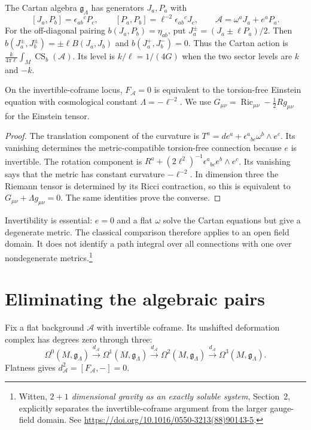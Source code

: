 The Cartan algebra $\mathfrak g_\Lambda$ has generators $J_a,P_a$ with
\[
 [J_a,P_b]=\epsilon_{ab}{}^cP_c,
 \qquad [P_a,P_b]=\ell^{-2}\epsilon_{ab}{}^cJ_c,
 \qquad \mathcal A=\omega^aJ_a+e^aP_a.
\]
For the off-diagonal pairing $b(J_a,P_b)=\eta_{ab}$, put
$J_a^\pm=(J_a\pm\ell P_a)/2$.
Then $b(J_a^\pm,J_b^\pm)=\pm\ell B(J_a,J_b)$ and
$b(J_a^+,J_b^-)=0$.
Thus the Cartan action is
$\frac{k}{4\pi\ell}\int_M\operatorname{CS}_b(\mathcal A)$.
Its level is $k/\ell=1/(4G)$ when the two sector levels
are $k$ and $-k$.

\begin{proposition}\label{mht:prop:gravity-flat-coframe}
On the invertible-coframe locus, $F_{\mathcal A}=0$ is equivalent
to the torsion-free Einstein equation with cosmological constant
$\Lambda=-\ell^{-2}$.
We use $G_{\mu\nu}=\operatorname{Ric}_{\mu\nu}
-\frac12Rg_{\mu\nu}$ for the Einstein tensor.
\end{proposition}

\begin{proof}
The translation component of the curvature is
$T^a=d e^a+\epsilon^a{}_{bc}\omega^b\wedge e^c$.
Its vanishing determines the metric-compatible torsion-free
connection because $e$ is invertible.
The rotation component is
$R^a+(2\ell^2)^{-1}\epsilon^a{}_{bc}e^b\wedge e^c$.
Its vanishing says that the metric has constant curvature
$-\ell^{-2}$.
In dimension three the Riemann tensor is determined by its Ricci
contraction, so this is equivalent to
$G_{\mu\nu}+\Lambda g_{\mu\nu}=0$.
The same identities prove the converse.
\end{proof}

Invertibility is essential: $e=0$ and a flat $\omega$ solve the
Cartan equations but give a degenerate metric.
The classical comparison therefore applies to an open field domain.
It does not identify a path integral over all connections with one
over nondegenerate metrics.\footnote{Witten,
\emph{$2+1$ dimensional gravity as an exactly soluble system},
Section~2, explicitly separates the invertible-coframe argument from
the larger gauge-field domain. See
\url{https://doi.org/10.1016/0550-3213(88)90143-5}.}

\section{Eliminating the algebraic pairs}

Fix a flat background $\mathcal A$ with invertible coframe.
Its unshifted deformation complex has degrees zero through three:
\begin{equation}\label{mht:eq:gravity-flat-complex}
 \Omega^0(M,\mathfrak g_\Lambda)
 \xrightarrow{d_{\mathcal A}}
 \Omega^1(M,\mathfrak g_\Lambda)
 \xrightarrow{d_{\mathcal A}}
 \Omega^2(M,\mathfrak g_\Lambda)
 \xrightarrow{d_{\mathcal A}}
 \Omega^3(M,\mathfrak g_\Lambda).
\end{equation}
Flatness gives $d_{\mathcal A}^2=[F_{\mathcal A},-]=0$.

